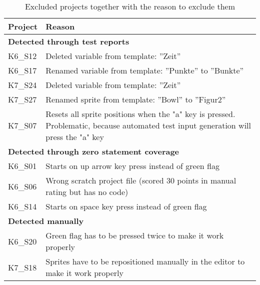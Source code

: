 \begin{table}[htpb]
    \centering
    \scriptsize
    \begin{tabular}{lp{10.5cm}}
        \toprule
        Project & Reason                                                                          \\
        \midrule
        \multicolumn{2}{l}{\textbf{Detected through test reports}}                                \\
        K6\_S12 & Deleted variable from template: ''Zeit''                                        \\
        K6\_S17 & Renamed variable from template: ''Punkte'' to ''Bunkte''                        \\
        K7\_S24 & Deleted variable from template: ''Zeit''                                        \\
        K7\_S27 & Renamed sprite from template: ''Bowl'' to ''Figur2''                            \\
        K7\_S07 & Resets all sprite positions when the "a" key is pressed.
                  Problematic, because automated test input generation will press the "a" key     \\[1.4\bigskipamount]

        \multicolumn{2}{l}{\textbf{Detected through zero statement coverage}}                     \\
        K6\_S01 & Starts on up arrow key press instead of green flag                              \\
        K6\_S06 & Wrong scratch project file (scored 30 points in manual rating but has no code)  \\
        K6\_S14 & Starts on space key press instead of green flag                                 \\[\medskipamount]

        \multicolumn{2}{l}{\textbf{Detected manually}}                                            \\
        K6\_S20 & Green flag has to be pressed twice to make it work properly                     \\
        K7\_S18 & Sprites have to be repositioned manually in the editor to make it work properly \\
        \bottomrule
    \end{tabular}
    \caption{Excluded projects together with the reason to exclude them}
    \label{tab:excluded_projects}
\end{table}

